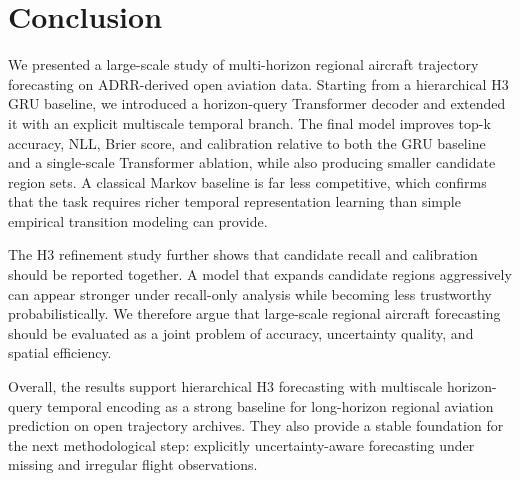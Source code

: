 \section{Conclusion}

We presented a large-scale study of multi-horizon regional aircraft trajectory forecasting on ADRR-derived open aviation data. Starting from a hierarchical H3 GRU baseline, we introduced a horizon-query Transformer decoder and extended it with an explicit multiscale temporal branch. The final model improves top-k accuracy, NLL, Brier score, and calibration relative to both the GRU baseline and a single-scale Transformer ablation, while also producing smaller candidate region sets. A classical Markov baseline is far less competitive, which confirms that the task requires richer temporal representation learning than simple empirical transition modeling can provide.

The H3 refinement study further shows that candidate recall and calibration should be reported together. A model that expands candidate regions aggressively can appear stronger under recall-only analysis while becoming less trustworthy probabilistically. We therefore argue that large-scale regional aircraft forecasting should be evaluated as a joint problem of accuracy, uncertainty quality, and spatial efficiency.

Overall, the results support hierarchical H3 forecasting with multiscale horizon-query temporal encoding as a strong baseline for long-horizon regional aviation prediction on open trajectory archives. They also provide a stable foundation for the next methodological step: explicitly uncertainty-aware forecasting under missing and irregular flight observations.
